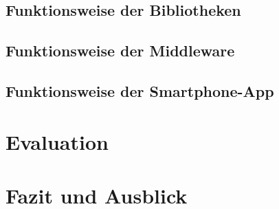 \documentclass{beamer}
\begin{document}
\subsection*{Funktionsweise der Bibliotheken}
\subsection*{Funktionsweise der Middleware}
\subsection*{Funktionsweise der Smartphone-App}

\section{Evaluation}
\begin{frame}
\end{frame}
\section{Fazit und Ausblick}
\begin{frame}
\end{frame}
\end{document}
